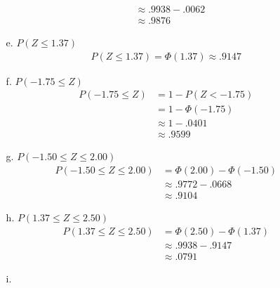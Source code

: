 \documentclass[letterpaper,12pt]{article}
\begin{document}
\begin{enumerate}
\begin{enumerate}
\begin{align*}
          &\approx .9938 - .0062 \\
          &\approx .9876
        \end{align*}
        \begin{center}
        \end{center}
      \item[e.]
        $P(Z \le 1.37)$
        \begin{align*}
          P(Z \le 1.37) = \Phi(1.37) \approx .9147
        \end{align*}
        \begin{center}
        \end{center}
      \item[f.]
        $P(-1.75 \le Z)$
        \begin{align*}
          P(-1.75 \le Z) &= 1 - P(Z < -1.75) \\
          &= 1 - \Phi(-1.75) \\
          &\approx 1 - .0401 \\
          &\approx .9599
        \end{align*}
        \begin{center}
        \end{center}
      \item[g.]
        $P(-1.50 \le Z \le 2.00)$
        \begin{align*}
          P(-1.50 \le Z \le 2.00) &= \Phi(2.00) - \Phi(-1.50) \\
          &\approx .9772 - .0668 \\
          &\approx .9104
        \end{align*}
        \begin{center}
        \end{center}
      \item[h.]
        $P(1.37 \le Z \le 2.50)$
        \begin{align*}
          P(1.37 \le Z \le 2.50) &= \Phi(2.50) - \Phi(1.37) \\
          &\approx .9938 - .9147 \\
          &\approx .0791
        \end{align*}
        \begin{center}
        \end{center}
      \item[i.]

\end{enumerate}
\end{enumerate}
\end{document}
